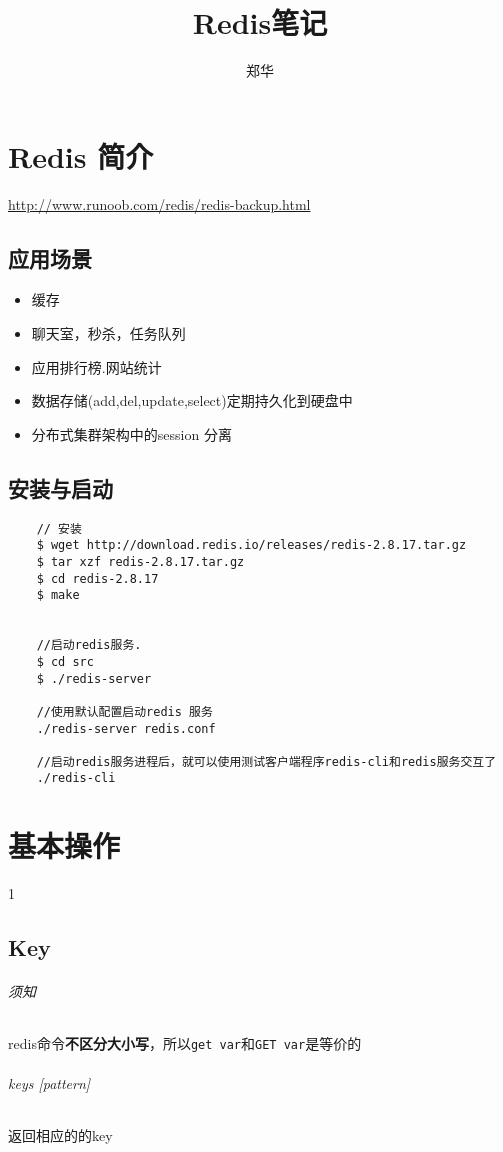 \documentclass[UTF8,a4paper,12pt]{ctexbook}
\author{\kaishu 郑华}
\title{\heiti Redis笔记}
\begin{document}
 	\maketitle
  

\chapter{Redis 简介}
	
	\url{http://www.runoob.com/redis/redis-backup.html}
	
	\section{应用场景}
		\begin{itemize}
			\item 缓存
			\item 聊天室，秒杀，任务队列
			\item 应用排行榜.网站统计
			\item 数据存储(add,del,update,select)定期持久化到硬盘中
			\item 分布式集群架构中的session 分离
		\end{itemize}
	\section{安装与启动}
		\begin{lstlisting}
	// 安装
	$ wget http://download.redis.io/releases/redis-2.8.17.tar.gz
	$ tar xzf redis-2.8.17.tar.gz
	$ cd redis-2.8.17
	$ make	
	
	
	//启动redis服务.
	$ cd src
	$ ./redis-server
	
	//使用默认配置启动redis	服务
	./redis-server redis.conf
	
	//启动redis服务进程后，就可以使用测试客户端程序redis-cli和redis服务交互了	
	./redis-cli		
		\end{lstlisting}

\chapter{基本操作}	
	
1	\section{Key}
		\subparagraph{须知}redis命令\textbf{不区分大小写}，所以\verb|get var|和\verb|GET var|是等价的
		
		\subparagraph{keys [pattern]} 返回相应的的key
		
\end{document}
